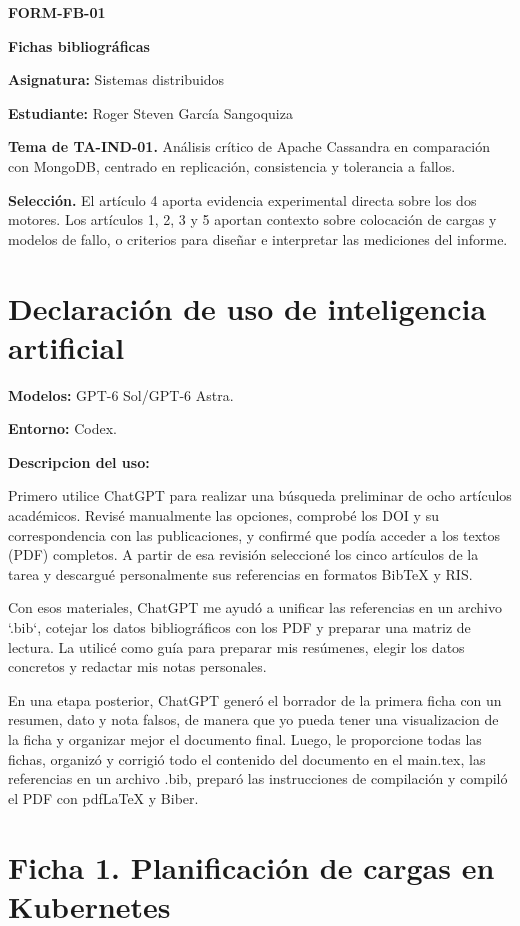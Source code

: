 \documentclass[11pt,a4paper]{article}
\begin{document}
{\large\bfseries FORM-FB-01\par}
{\LARGE\bfseries Fichas bibliográficas\par}
{\large \textbf{Asignatura:} Sistemas distribuidos\par}
{\large \textbf{Estudiante:} Roger Steven García Sangoquiza\par}
\bigskip

\textbf{Tema de TA-IND-01.} Análisis crítico de Apache Cassandra en comparación con MongoDB, centrado en replicación, consistencia y tolerancia a fallos.

\textbf{Selección.} El artículo 4 aporta evidencia experimental directa sobre los dos motores. Los artículos 1, 2, 3 y 5 aportan contexto sobre colocación de cargas y modelos de fallo, o criterios para diseñar e interpretar las mediciones del informe.

\section*{Declaración de uso de inteligencia artificial}

\textbf{Modelos:} GPT-6 Sol/GPT-6 Astra.

\textbf{Entorno:} Codex.

\textbf{Descripcion del uso:}

Primero utilice ChatGPT para realizar una búsqueda preliminar de ocho artículos académicos. Revisé manualmente las opciones, comprobé los DOI y su correspondencia con las publicaciones, y confirmé que podía acceder a los textos (PDF) completos. A partir de esa revisión seleccioné los cinco artículos de la tarea y descargué personalmente sus referencias en formatos BibTeX y RIS.

Con esos materiales, ChatGPT me ayudó a unificar las referencias en un archivo `.bib`, cotejar los datos bibliográficos con los PDF y preparar una matriz de lectura. La utilicé como guía para preparar mis resúmenes, elegir los datos concretos y redactar mis notas personales.

En una etapa posterior, ChatGPT generó el borrador de la primera ficha con un resumen, dato y nota falsos, de manera que yo pueda tener una visualizacion de la ficha y organizar mejor el documento final. Luego, le proporcione todas las fichas, organizó y corrigió todo el contenido del documento en el main.tex, las referencias en un archivo .bib, preparó las instrucciones de compilación y compiló el PDF con pdfLaTeX y Biber.

\clearpage
\section*{Ficha 1. Planificación de cargas en Kubernetes}
\end{document}
